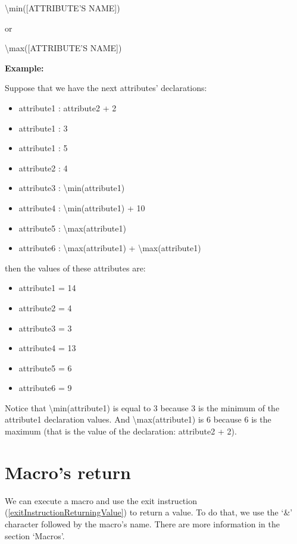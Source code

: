 \documentclass[11pt,a4paper,openright,oneside]{book}
\newenvironment{ex}
{
  \setlength{\parindent}{0cm}
  \large \textbf{Example:} \normalsize 
}
{}
\begin{document}
\begin{center} \textsf{\textbackslash min(\textsc{\scriptsize[ATTRIBUTE'S NAME]})} \end{center}
or
\begin{center} \textsf{\textbackslash max(\textsc{\scriptsize[ATTRIBUTE'S NAME]})} \end{center}


  \begin{ex}
  Suppose that we have the next attributes' declarations:
  \begin{itemize}
    \item \textsf{attribute1 : attribute2 + 2}
    \item \textsf{attribute1 : 3}
    \item \textsf{attribute1 : 5}
    \item \textsf{attribute2 : 4}
    \item \textsf{attribute3 : \textbackslash min(attribute1)}
    \item \textsf{attribute4 : \textbackslash min(attribute1) + 10}
    \item \textsf{attribute5 : \textbackslash max(attribute1)}
    \item \textsf{attribute6 : \textbackslash max(attribute1) + \textbackslash max(attribute1)}
  \end{itemize}
  then the values of these attributes are:
  \begin{itemize}
    \item \textsf{attribute1 = 14}
    \item \textsf{attribute2 = 4}
    \item \textsf{attribute3 = 3}
    \item \textsf{attribute4 = 13}
    \item \textsf{attribute5 = 6}
    \item \textsf{attribute6 = 9}
  \end{itemize}
  Notice that \textsf{\textbackslash min(attribute1)} is equal to \textsf{3} because \textsf{3} is the minimum of the \textsf{attribute1} declaration values. And \textsf{\textbackslash max(attribute1)} is \textsf{6} because \textsf{6} is the maximum (that is the value of the declaration: \textsf{attribute2 + 2}).
  \end{ex}

\section{Macro's return} \label{macroParameter}
  We can execute a macro and use the \textsf{exit} instruction (\ref{exitInstructionReturningValue}) to return a value. To do that, we use the `\textsf{\&}' character followed by the macro's name. There are more information in the section `Macros'.
\end{document}
